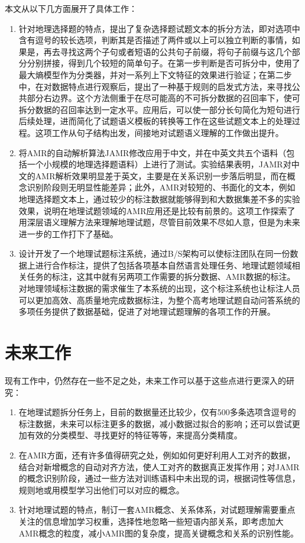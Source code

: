 \documentclass[master, winfont]{njuthesis}
\begin{document}
本文从以下几方面展开了具体工作：
\begin{enumerate}
  \item 针对地理选择题的特点，提出了复杂选择题试题文本的拆分方法，即对选项中含有逗号的较长选项，判断其是否描述了两件或以上可以独立判断的事情，如果是，再去寻找这两个子句或者短语的公共句子前缀，将句子前缀与这几个部分分别拼接，得到几个较短的简单句子。在第一步判断是否可拆分中，使用了最大熵模型作为分类器，并对一系列上下文特征的效果进行验证；在第二步中，在对数据特点进行观察后，提出了一种基于规则的启发式方法，来寻找公共部分右边界。这个方法侧重于在尽可能高的不可拆分数据的召回率下，使可拆分数据的召回率达到一定水平。应用后，可以使一部分长句简化为短句进行后续处理，进而简化了试题语义模板的转换等工作在这些试题文本上的处理过程。这项工作从句子结构出发，间接地对试题语义理解的工作做出提升。
  \item 将AMR的自动解析算法JAMR修改应用于中文，并在中英文共五个语料（包括一个小规模的地理选择题语料）上进行了测试。实验结果表明，JAMR对中文的AMR解析效果明显差于英文，主要是在关系识别一步落后明显，而在概念识别阶段则无明显性能差异；此外，AMR对较短的、书面化的文本，例如地理选择题文本上，通过较少的标注数据就能够得到和大数据集差不多的实验效果，说明在地理试题领域的AMR应用还是比较有前景的。这项工作探索了用深层语义理解方法来理解地理试题，尽管目前效果不尽如人意，但是为未来进一步的工作打下了基础。
  \item 设计开发了一个地理试题标注系统，通过B/S架构可以使标注团队在同一份数据上进行合作标注，提供了包括各项基本自然语言处理任务、地理试题领域相关任务的标注，这其中就有另两项工作需要的拆分数据、AMR数据的标注。对地理领域标注数据的需求催生了本系统的出现，这个标注系统也让标注人员可以更加高效、高质量地完成数据标注，为整个高考地理试题自动问答系统的多项任务提供了数据基础，促进了对地理试题理解的各项工作的开展。
  \end{enumerate}

\section{未来工作}
现有工作中，仍然存在一些不足之处，未来工作可以基于这些点进行更深入的研究：
\begin{enumerate}
  \item 在地理试题拆分任务上，目前的数据量还比较少，仅有500多条选项含逗号的标注数据，未来可以标注更多的数据，减小数据过拟合的影响；还可以尝试更加有效的分类模型、寻找更好的特征等等，来提高分类精度。
  \item 在AMR方面，还有许多值得研究之处，例如如何更好利用人工对齐的数据，结合对新增概念的自动对齐方法，使人工对齐的数据真正发挥作用；对JAMR的概念识别阶段，通过一些方法对训练语料中未出现的词，根据词性等信息，规则地或用模型学习出他们可以对应的概念。
  \item 针对地理试题的特点，制订一套AMR概念、关系体系，对试题理解需要重点关注的信息增加学习权重，选择性地忽略一些短语内部关系，即考虑加大AMR概念的粒度，减小AMR图的复杂度，提高关键概念和关系的识别性能。
\end{enumerate}
\end{document}

